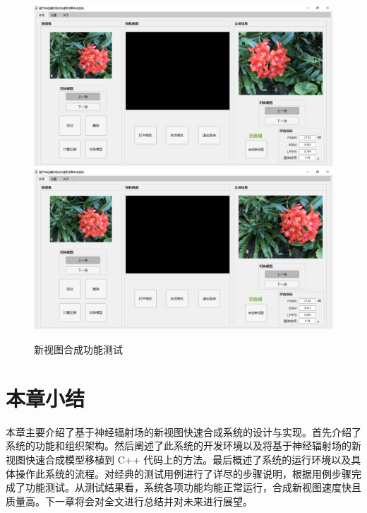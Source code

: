 \begin{figure}[bhtp]
  \subcaptionbox{\label{fig:viewsynthesis-g}}
    {\includegraphics[width=0.45\linewidth]{figures/system/3-g.png}}
    \subcaptionbox{\label{fig:viewsynthesis-h}}
    {\includegraphics[width=0.45\linewidth]{figures/system/3-h.png}}
  \caption{新视图合成功能测试}
  \label{fig:viewsynthesis}
\end{figure}
\newpage
\section{本章小结}
本章主要介绍了基于神经辐射场的新视图快速合成系统的设计与实现。首先介绍了系统的功能和组织架构。然后阐述了此系统的开发环境以及将基于神经辐射场的新视图快速合成模型移植到 C++ 代码上的方法。最后概述了系统的运行环境以及具体操作此系统的流程。对经典的测试用例进行了详尽的步骤说明，根据用例步骤完成了功能测试。从测试结果看，系统各项功能均能正常运行，合成新视图速度快且质量高。下一章将会对全文进行总结并对未来进行展望。






